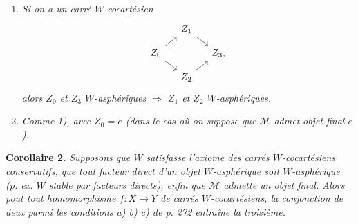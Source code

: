 \begin{enumerate}
\item[\textit{1)}] \textit{Si on a un carré $W$-cocartésien}
\[
\begin{tikzcd}[ampersand replacement=\&, column sep=small, row sep=small]
 \& Z_1 \arrow[dr] \& \\
Z_0 \arrow[ur] \arrow[dr] \& \& Z_3, \\
 \& Z_2 \arrow[ur] \&
\end{tikzcd}
\]
\textit{alors $Z_0$ et $Z_3$ $W$-asphériques $\Longrightarrow$ $Z_1$ et $Z_2$ $W$-asphériques.}
\item[\textit{1$'$)}] \textit{Comme 1), avec $Z_0 = e$ (dans le cas où on suppose que $\mathcal{M}$ admet} \textit{objet final $e$).}
\end{enumerate}


\textbf{Corollaire 2.} \textit{Supposons que $W$ satisfasse l'axiome des carrés $W$-cocartésiens conservatifs, que tout facteur direct d'un objet $W$-asphérique soit $W$-asphérique (p. ex. $W$ stable par facteurs directs), enfin que $\mathcal{M}$ admette un objet final. Alors pout tout homomorphisme $f : X \longrightarrow Y$ de carrés $W$-cocartésiens, la conjonction de deux parmi les conditions a) b) c) de p. 272 entraîne la troisième.} %


